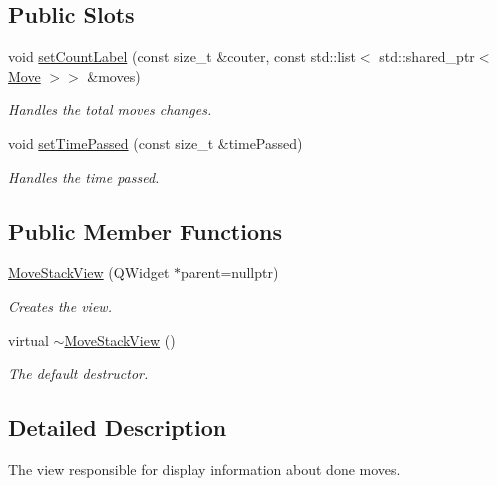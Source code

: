 \subsection*{Public Slots}
\begin{DoxyCompactItemize}
\item 
void \mbox{\hyperlink{class_move_stack_view_ad3439eab1b100699aa82ece0b21de8a8}{set\+Count\+Label}} (const size\+\_\+t \&couter, const std\+::list$<$ std\+::shared\+\_\+ptr$<$ \mbox{\hyperlink{struct_move}{Move}} $>$$>$ \&moves)
\begin{DoxyCompactList}\small\item\em Handles the total moves changes. \end{DoxyCompactList}\item 
void \mbox{\hyperlink{class_move_stack_view_a6a70962da0c881426a408bb78cf9f974}{set\+Time\+Passed}} (const size\+\_\+t \&time\+Passed)
\begin{DoxyCompactList}\small\item\em Handles the time passed. \end{DoxyCompactList}\end{DoxyCompactItemize}
\subsection*{Public Member Functions}
\begin{DoxyCompactItemize}
\item 
\mbox{\hyperlink{class_move_stack_view_aee51704e36aeb3f7d5a5a0c6be03b414}{Move\+Stack\+View}} (Q\+Widget $\ast$parent=nullptr)
\begin{DoxyCompactList}\small\item\em Creates the view. \end{DoxyCompactList}\item 
virtual \mbox{\hyperlink{class_move_stack_view_a39b59ddaeb4178aa284864661047127c}{$\sim$\+Move\+Stack\+View}} ()
\begin{DoxyCompactList}\small\item\em The default destructor. \end{DoxyCompactList}\end{DoxyCompactItemize}


\subsection{Detailed Description}
The view responsible for display information about done moves. 



